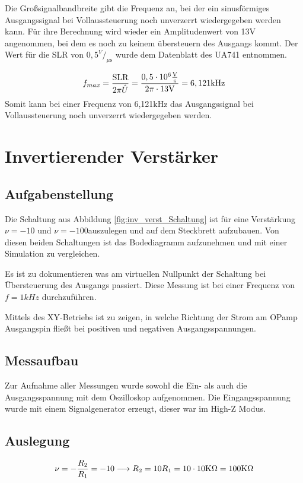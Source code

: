 Die Großsignalbandbreite gibt die Frequenz an, bei der ein sinusförmiges Ausgangssignal bei Vollaussteuerung noch unverzerrt wiedergegeben werden kann. Für ihre Berechnung wird wieder ein Amplitudenwert von 13V angenommen, bei dem es noch zu keinem übersteuern des Ausgangs kommt. Der Wert für die SLR von $0,5^V/_{\mu \text{s}}$ wurde dem Datenblatt des UA741 entnommen.

\begin{align}
    f_{max}=\frac{\text{SLR}}{2\pi\hat{U}}=\frac{0,5\cdot 10^6\frac{\text{V}}{\text{s}}}{2\pi\cdot13\text{V}}=6,121\text{kHz}
\end{align}
Somit kann bei einer Frequenz von 6,121kHz das Ausgangssignal bei Vollaussteuerung noch unverzerrt wiedergegeben werden.

\section{Invertierender Verstärker}
\subsection{Aufgabenstellung}
Die Schaltung aus Abbildung \ref{fig:inv_verst_Schaltung} ist für eine Verstärkung $\nu = -10$ und $\nu=-100$auszulegen und auf dem Steckbrett aufzubauen. Von diesen beiden Schaltungen ist das Bodediagramm aufzunehmen und mit einer Simulation zu vergleichen.

Es ist zu dokumentieren was am virtuellen Nullpunkt der Schaltung bei Übersteuerung des Ausgangs passiert. Diese Messung ist bei einer Frequenz von $f=1kHz$ durchzuführen. 

Mittels des XY-Betriebs ist zu zeigen, in welche Richtung der Strom am OPamp Ausgangspin fließt bei positiven und negativen Ausgangsspannungen. 


\subsection{Messaufbau}
Zur Aufnahme aller Messungen wurde sowohl die Ein- als auch die Ausgangsspannung mit dem Oszilloskop aufgenommen. Die Eingangsspannung wurde mit einem Signalgenerator erzeugt, dieser war im High-Z Modus. 


\subsection{Auslegung}
\begin{align}
    \nu = -\frac{R_2}{R_1} =-10 \longrightarrow R_2 = 10R_1=10\cdot 10\text{K}\Omega =100\text{K}\Omega
\end{align}
